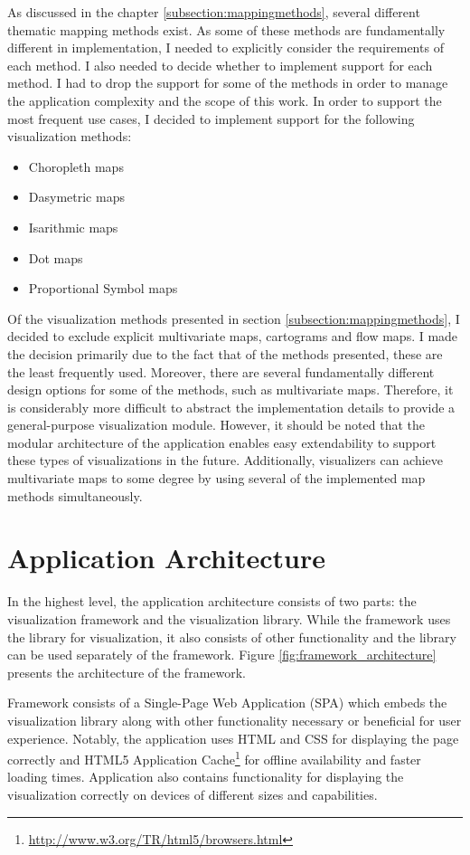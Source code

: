 As discussed in the chapter \ref{subsection:mappingmethods}, several different thematic mapping methods exist. As some of these methods are fundamentally different in implementation, I needed to explicitly consider the requirements of each method. I also needed to decide whether to implement support for each method. I had to drop the support for some of the methods in order to manage the application complexity and the scope of this work. In order to support the most frequent use cases, I decided to implement support for the following visualization methods:

\begin{itemize}
	\item Choropleth maps
	\item Dasymetric maps
	\item Isarithmic maps
	\item Dot maps
	\item Proportional Symbol maps
\end{itemize}

Of the visualization methods presented in section \ref{subsection:mappingmethods}, I decided to exclude explicit multivariate maps, cartograms and flow maps. I made the decision primarily due to the fact that of the methods presented, these are the least frequently used. Moreover, there are several fundamentally different design options for some of the methods, such as multivariate maps. Therefore, it is considerably more difficult to abstract the implementation details to provide a general-purpose visualization module. However, it should be noted that the modular architecture of the application enables easy extendability to support these types of visualizations in the future. Additionally, visualizers can achieve multivariate maps to some degree by using several of the implemented map methods simultaneously.

\section{Application Architecture}

In the highest level, the application architecture consists of two parts: the visualization framework and the visualization library. While the framework uses the library for visualization, it also consists of other functionality and the library can be used separately of the framework. Figure \ref{fig:framework_architecture} presents the architecture of the framework.

Framework consists of a Single-Page Web Application (SPA) which embeds the visualization library along with other functionality necessary or beneficial for user experience. Notably, the application uses HTML and CSS for displaying the page correctly and HTML5 Application Cache\footnote{\url{http://www.w3.org/TR/html5/browsers.html}} for offline availability and faster loading times. Application also contains functionality for displaying the visualization correctly on devices of different sizes and capabilities.

